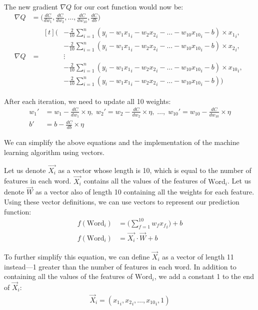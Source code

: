 \documentclass[12pt, demo]{article}
\begin{document}
The new gradient $\nabla Q$ for our cost function would now be:
\begin{align*}
	\nabla Q & = \Big(\frac{dC}{dw_1}, \frac{dC}{dw_2}, \dots, \frac{dC}{dw_{10}}, \frac{dC}{db}\Big)
	\\
	\nabla Q & =
	\begin{aligned}[t]
		\Big(
		 & -\frac{2}{10} \sum_{i=1}^{n} (y_i - w_1{x_1}_i - w_2{x_2}_i - \dots - w_{10}{x_{10}}_i - b) \times {x_1}_i,
		\\
		 & -\frac{2}{10} \sum_{i=1}^{n} (y_i - w_1{x_1}_i - w_2{x_2}_i - \dots - w_{10}{x_{10}}_i - b) \times {x_2}_i,
		\\
		 & \vdots
		\\
		 & -\frac{2}{10} \sum_{i=1}^{n} (y_i - w_1{x_1}_i - w_2{x_2}_i - \dots - w_{10}{x_{10}}_i - b) \times {x_{10}}_i,
		\\
		 & -\frac{2}{10} \sum_{i=1}^{n} (y_i - w_1{x_1}_i - w_2{x_2}_i - \dots - w_{10}{x_{10}}_i - b)
		\Big)
	\end{aligned}
\end{align*}

After each iteration, we need to update all 10 weights:
\begin{align*}
	w_1' & = w_1 - \frac{dC}{dw_1} \times \eta,
	\;
	w_2' = w_2 - \frac{dC}{dw_2} \times \eta,
	\;
	\dots,
	\;
	w_{10}' = w_{10} - \frac{dC}{dw_{10}} \times \eta
	\\
	b'   & = b - \frac{dC}{db} \times \eta
\end{align*}

We can simplify the above equations and the implementation of the machine learning algorithm using vectors.

Let us denote $\vec{X_i}$ as a vector whose length is 10, which is equal to the number of features in each word. $\vec{X_i}$ contains all the values of the features of $\text{Word}_i$. Let us denote $\vec{W}$ as a vector also of length 10 containing all the weights for each feature. Using these vector definitions, we can use vectors to represent our prediction function:
\begin{align*}
	f(\text{Word}_i) & = \Big(\sum_{f=1}^{10} w_f{x_f}_i\Big) + b
	\\
	f(\text{Word}_i) & = \vec{X_i} \cdot \vec{W} + b
\end{align*}

To further simplify this equation, we can define $\vec{X}_i$ as a vector of length 11 instead—1 greater than the number of features in each word. In addition to containing all the values of the features of $\text{Word}_i$, we add a constant 1 to the end of $\vec{X}_i$:
\begin{align*}
	\vec{X}_i = ({x_1}_i, {x_2}_i, \dots, {x_{10}}_i, 1)
\end{align*}
\end{document}
